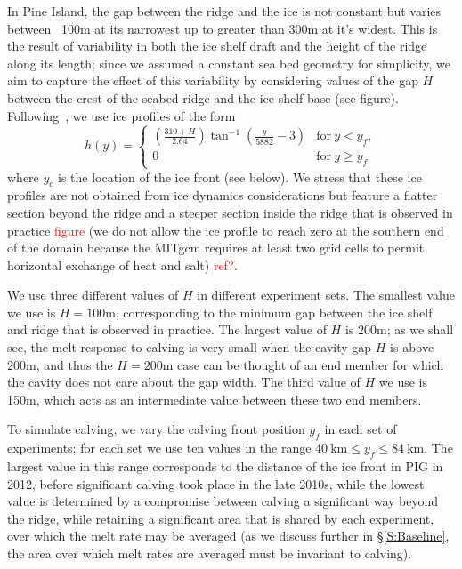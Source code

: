 \documentclass[draft]{agujournal2019}
\newcommand{\red}[1]{\textcolor{red}{#1}}
\begin{document}
In Pine Island, the gap between the ridge and the ice is not constant but varies between ~100m at its narrowest up to greater than 300m at it's widest. This is the result of variability in both the ice shelf draft and the height of the ridge along its length; since we assumed a constant sea bed geometry for simplicity, we aim to capture the effect of this variability by considering values of the gap $H$ between the crest of the seabed ridge and the ice shelf base (see figure). Following~, we use ice profiles of the form
\begin{equation}
    h(y) = \begin{cases}
    \left(\frac{310 + H}{2.64}\right)\tan^{-1}\left(\frac{y}{5882} -3\right) & \text{for}~y < y_f,\\
    0  & \text{for}~y \geq y_f
    \end{cases}
\end{equation}
where $y_c$ is the location of the ice front (see below). We stress that these ice profiles are not obtained from ice dynamics considerations but feature a flatter section beyond the ridge and a steeper section inside the ridge that is observed in practice \red{figure} (we do not allow the ice profile to reach zero at the southern end of the domain because the MITgcm requires at least two grid cells to permit horizontal exchange of heat and salt) \red{ref?}.

We use three different values of $H$ in different experiment sets. The smallest value we use is $H = 100$m, corresponding to the minimum gap between the ice shelf and ridge that is observed in practice. The largest value of $H$ is  $200$m; as we shall see, the melt response to calving is very small when the cavity gap $H$ is above $200$m, and thus the $H = 200$m case can be thought of an end member for which the cavity does not care about the gap width. The third value of $H$ we use is 150m, which acts as an intermediate value between these two end members.

To simulate calving, we vary the calving front position $y_f$ in each set of experiments; for each set we use ten values in the range $40~\text{km} \leq y_f \leq 84~\text{km}$. The largest value in this range corresponds to the distance of the ice front in PIG in 2012, before significant calving took place in the late 2010s, while the lowest value is determined by a compromise between calving a significant way beyond the ridge, while retaining a significant area that is shared by each experiment, over which the melt rate may be averaged (as we discuss further in \S\ref{S:Baseline}, the area over which melt rates are averaged must be invariant to calving).
\end{document}
